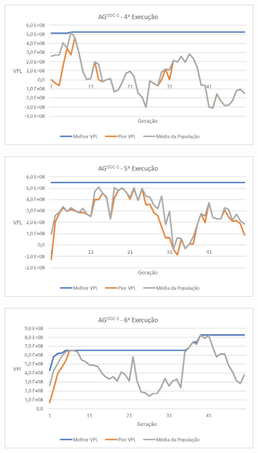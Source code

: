 \documentclass[12pt,a4paper]{report}
\begin{document}
\begin{figure}[H]
\centering

\includegraphics[scale=1]{ApA/GCC/4}
\end{figure}

\begin{figure}[htb]
\centering

\includegraphics[scale=1]{ApA/GCC/5}
\end{figure}


\begin{figure}[H]
\centering

\includegraphics[scale=1]{ApA/GCC/6}
\end{figure}
\end{document}
